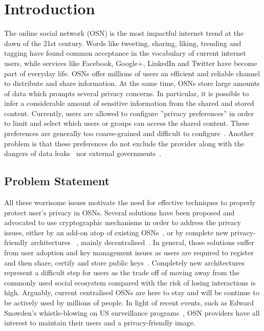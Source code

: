\chapter{Introduction}
\label{cha:intro}
The online social network (OSN) is the most impactful internet trend at the dawn of the 21st century. Words like tweeting, sharing, liking, trending and tagging have found common acceptance in the vocabulary of current internet users, while services like Facebook, Google+, LinkedIn and Twitter have become part of everyday life. OSNs offer millions of users an efficient and reliable channel to distribute and share information. At the same time, OSNs store large amounts of data which prompts several privacy concerns. In particular, it is possible to infer a considerable amount of sensitive information from the shared and stored content. Currently, users are allowed to configure ''privacy preferences'' in order to limit and select which users or groups can access the shared content. These preferences are generally too coarse-grained and difficult to configure~\cite{art:BonneauPS10}. Another problem is that these preferences do not exclude the provider along with the dangers of data leaks~\cite{art:Fischetti11} nor external governments~\cite{prism}.



\section{Problem Statement}
\label{sec:problem_statement}
All these worrisome issues motivate the need for effective techniques to properly protect user's privacy in OSNs. Several solutions have been proposed and advocated to use cryptographic mechanisms in order to address the privacy issues, either by an add-on atop of existing OSNs~\cite{art:BadenBSBS09,art:BeatoKW11,art:GuhaSTF08,art:LuoXH09}, or by complete new privacy-friendly architectures~ \cite{art:CristofaroSTW11}, mainly decentralised~\cite{art:CutilloMO11,NYT2010.Diaspora}. In general, those solutions suffer from user adoption and key management issues as users are required to register and then share, certify and store public keys~\cite{art:BalseBADG14}. Completely new architectures represent a difficult step for users as the trade off of moving away from the commonly used social ecosystem compared with the risk of losing interactions is high. Arguably, current centralised OSNs are here to stay and will be continue to be actively used by millions of people. In light of recent events, such as Edward Snowden's whistle-blowing on US surveillance programs~\cite{prism}, OSN providers have all interest to maintain their users and a privacy-friendly image.

